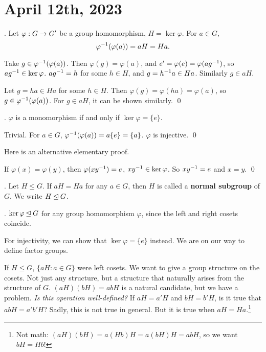 \section*{April 12th, 2023}

\thm. Let \(\varphi : G \rightarrow G'\) be a group homomorphism, \(H = \ker \varphi\). For \(a \in G\),
\[
    \varphi^{-1}(\varphi(a)) = aH = Ha.
\]

\pf \note{\(\subset\)} Take \(g \in \varphi^{-1}(\varphi(a))\). Then \(\varphi(g) = \varphi(a)\), and \(e' = \varphi(e) = \varphi(ag^{-1})\), so \(ag^{-1} \in \ker\varphi\). \(ag^{-1} = h\) for some \(h \in H\), and \(g = h^{-1} a \in Ha\). Similarly \(g \in aH\).

\note{\(\supset\)} Let \(g = ha \in Ha\) for some \(h \in H\). Then \(\varphi(g) = \varphi(ha) = \varphi(a)\), so \(g \in \varphi^{-1}(\varphi(a))\). For \(g \in aH\), it can be shown similarly. \qed

\cor. \(\varphi\) is a monomorphism if and only if \(\ker\varphi = \{e\}\).

\pf \note{\mimp} Trivial. \note{\mimpd} For \(a \in G\), \(\varphi^{-1}(\varphi(a)) = a \{e\} = \{a\}\). \(\varphi\) is injective. \qed

Here is an alternative elementary proof.

\pf \note{\mimpd} If \(\varphi(x) = \varphi(y)\), then \(\varphi(xy^{-1}) = e\), \(xy^{-1} \in \ker\varphi\). So \(xy^{-1} = e\) and \(x = y\). \qed

.  Let \(H \leq G\). If \(aH = Ha\) for any \(a \in G\), then \(H\) is called a \textbf{normal subgroup} of \(G\). We write \(H \unlhd G\).

\cor. \(\ker\varphi \unlhd G\) for any group homomorphism \(\varphi\), since the left and right cosets coincide.

For injectivity, we can show that \(\ker \varphi = \{e\}\) instead. We are on our way to define factor groups.


If \(H \leq G\), \(\{aH : a \in G\}\) were left cosets. We want to give a group structure on the cosets. Not just any structure, but a structure that naturally arises from the structure of \(G\). \((aH)(bH) = abH\) is a natural candidate, but we have a problem. \textit{Is this operation well-defined?} If \(aH = a'H\) and \(bH = b'H\), is it true that \(abH = a'b'H\)? Sadly, this is not true in general. But it is true when \(aH = Ha\).\footnote{Not math: \((aH)(bH) = a(Hb)H = a(bH)H = abH\), so we want \(bH = Hb\)!}

